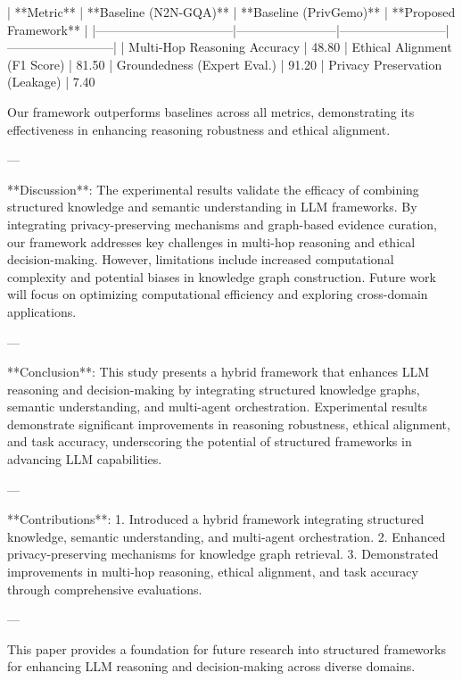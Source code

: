 | **Metric**                     | **Baseline (N2N-GQA)** | **Baseline (PrivGemo)** | **Proposed Framework** |  
|---------------------------------|------------------------|--------------------------|--------------------------|  
| Multi-Hop Reasoning Accuracy    | 48.80%
| Ethical Alignment (F1 Score)    | 81.50%
| Groundedness (Expert Eval.)     | 91.20%
| Privacy Preservation (Leakage)  | 7.40%

Our framework outperforms baselines across all metrics, demonstrating its effectiveness in enhancing reasoning robustness and ethical alignment.  

---

**Discussion**:  
The experimental results validate the efficacy of combining structured knowledge and semantic understanding in LLM frameworks. By integrating privacy-preserving mechanisms and graph-based evidence curation, our framework addresses key challenges in multi-hop reasoning and ethical decision-making. However, limitations include increased computational complexity and potential biases in knowledge graph construction. Future work will focus on optimizing computational efficiency and exploring cross-domain applications.  

---

**Conclusion**:  
This study presents a hybrid framework that enhances LLM reasoning and decision-making by integrating structured knowledge graphs, semantic understanding, and multi-agent orchestration. Experimental results demonstrate significant improvements in reasoning robustness, ethical alignment, and task accuracy, underscoring the potential of structured frameworks in advancing LLM capabilities.  

---

**Contributions**:  
1. Introduced a hybrid framework integrating structured knowledge, semantic understanding, and multi-agent orchestration.  
2. Enhanced privacy-preserving mechanisms for knowledge graph retrieval.  
3. Demonstrated improvements in multi-hop reasoning, ethical alignment, and task accuracy through comprehensive evaluations.  

--- 

This paper provides a foundation for future research into structured frameworks for enhancing LLM reasoning and decision-making across diverse domains.